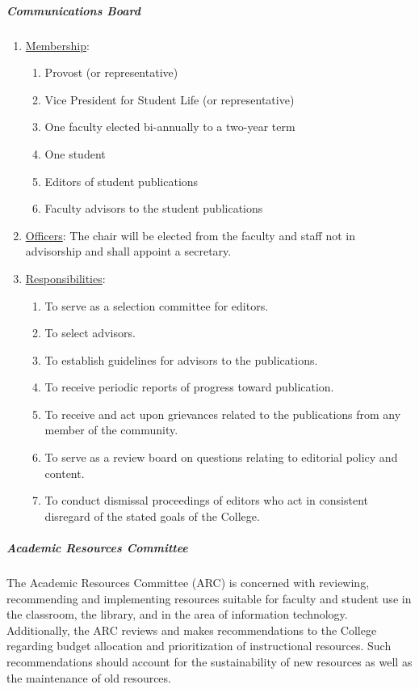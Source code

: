 				\subparagraph{Communications Board}
					\begin{enumerate}[label=\alph*)]
						\item{\underline{Membership}:
							\begin{enumerate}[label=\arabic*)]
								\item{Provost (or representative)}
								\item{Vice President for Student Life (or representative)}
								\item{One faculty elected bi-annually to a two-year term}
								\item{One student}
								\item{Editors of student publications}
								\item{Faculty advisors to the student publications}
							\end{enumerate}
						}
						\item{\underline{Officers}:
							The chair will be elected from the faculty and staff not in advisorship and shall appoint a secretary.
						}
						\item{\underline{Responsibilities}:
							\begin{enumerate}[label=\arabic*)]
								\item{To serve as a selection committee for editors.}
								\item{To select advisors.}
								\item{To establish guidelines for advisors to the publications.}
								\item{To receive periodic reports of progress toward publication.}
								\item{To receive and act upon grievances related to the publications from any member of the community.}
								\item{To serve as a review board on questions relating to editorial policy and content.}
								\item{To conduct dismissal proceedings of editors who act in consistent disregard of the stated goals of the College.}
							\end{enumerate}
						}
					\end{enumerate}
				\subparagraph{Academic Resources Committee}
					The Academic Resources Committee (ARC) is concerned with reviewing, recommending and implementing resources suitable for faculty and student use in the classroom, the library, and in the area of information technology. Additionally, the ARC reviews and makes recommendations to the College regarding budget allocation and prioritization of instructional resources. Such recommendations should account for the sustainability of new resources as well as the maintenance of old resources.
